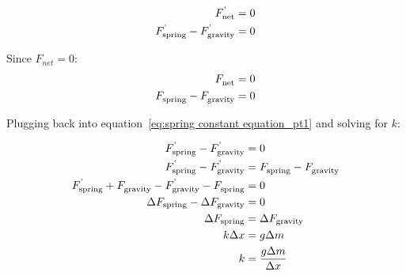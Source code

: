 \documentclass[titlepage]{article}
\begin{document}
            \begin{equation}
                \begin{aligned}
                    \small
                    F_{\text{net}}^{\text{'}} &= 0 \\
                    F_{\text{spring}}^{\text{'}} - F_{\text{gravity}}^{\text{'}} &= 0 \\
                \end{aligned}\label{eq:spring constant equation_pt1}
            \end{equation}
            
            Since $F_{net}^{\text{}} = 0$:
            \begin{equation}
                \begin{aligned}
                    \notag
                    \small
                    F_{\text{net}}^{\text{}} &= 0 \\
                    F_{\text{spring}}^{\text{}} - F_{\text{gravity}}^{\text{}} &= 0 \\
                \end{aligned}\label{eq:spring constant equation_pt2}
            \end{equation}
            
            Plugging back into equation~\ref{eq:spring constant equation_pt1} and solving for $k$:
            
            \begin{equation}
                \begin{aligned}
                    \small
                    F_{\text{spring}}^{\text{'}} - F_{\text{gravity}}^{\text{'}} &= 0 \\
                    F_{\text{spring}}^{\text{'}} - F_{\text{gravity}}^{\text{'}} &= F_{\text{spring}}^{\text{}} - F_{\text{gravity}}^{\text{}} \\
                    F_{\text{spring}}^{\text{'}} + F_{\text{gravity}}^{\text{}}- F_{\text{gravity}}^{\text{'}} - F_{\text{spring}}^{\text{}} &= 0 \\
                    \Delta F_{\text{spring}} - \Delta F_{\text{gravity}} &= 0 \\
                    \Delta F_{\text{spring}} &= \Delta F_{\text{gravity}} \\
                    k\Delta x &= g \Delta m \\
                    k &= \frac{g \Delta m}{\Delta x} \\
                \end{aligned}\label{eq:spring constant equation}
            \end{equation}
            
\end{document}
